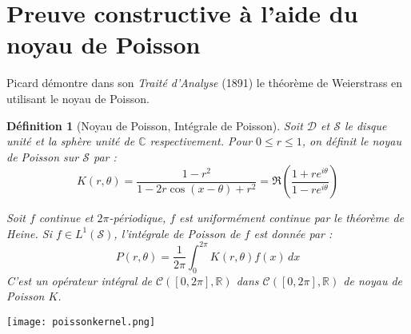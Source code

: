 \documentclass[
	10pt, %
]{beamer}
\newtheorem{defi}[subsubsection]{Définition}
\begin{document}
\section{Preuve constructive à l'aide du noyau de Poisson}
\begin{frame}

Picard démontre dans son \textit{Traité d'Analyse} (1891) le théorème de Weierstrass en utilisant le noyau de Poisson. 
\begin{defi}[Noyau de Poisson, Intégrale de Poisson]
	Soit \( \mathcal{D} \) et \( \mathcal{S} \) le disque unité et la sphère unité de \( \mathbb{C} \) respectivement. Pour \( 0 \leq r \leq 1 \), on définit le noyau de Poisson sur \( \mathcal{S} \) par :
\begin{equation*}
	K(r,\theta) = \frac{1 - r^{2}}{1-2r\cos(x-\theta)+r^{2}} = \Re(\frac{1 + re^{i\theta}}{1 - re^{i\theta}})
\end{equation*}

Soit \( f \) continue et \( 2\pi\)-périodique, \( f \) est uniformément continue par le théorème de Heine. Si \( f \in L^{1}(\mathcal{S}) \), l'intégrale de Poisson de \( f \) est donnée par :
\begin{equation*}
	P(r,\theta) = \frac{1}{2\pi} \int_0^{2\pi} 
	K(r,\theta) f(x) \, dx
\end{equation*}
C'est un opérateur intégral de \( \mathcal{C}([0,2\pi],\mathbb{R}) \) dans \( \mathcal{C}([0,2\pi],\mathbb{R}) \) de noyau de Poisson \( K \). \nocite{pinkus2000approximation}

	\end{defi}
\end{frame}

\begin{frame}
	\center\texttt{[image: poissonkernel.png]}
\end{frame}
\end{document}
